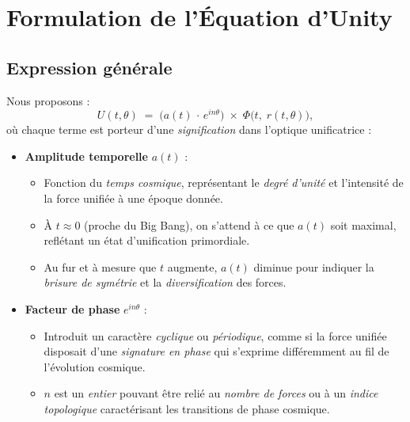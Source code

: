 \documentclass[12pt]{article}
\begin{document}
\section{Formulation de l'Équation d'Unity}

\subsection{Expression générale}

Nous proposons :
\begin{equation}
\label{eq:unity}
U(t,\theta) 
\;=\; \bigl(a(t)\,\cdot\,e^{i n \theta}\bigr)\;\times\;\Phi\bigl(t,\;r(t,\theta)\bigr),
\end{equation}
où chaque terme est porteur d'une \emph{signification} dans l'optique unificatrice :

\begin{itemize}
    \item \textbf{Amplitude temporelle} $a(t)$ : 
    \begin{itemize}
        \item Fonction du \emph{temps cosmique}, représentant le \textit{degré d'unité} 
              et l'intensité de la force unifiée à une époque donnée.
        \item À $t \approx 0$ (proche du Big Bang), on s'attend à ce que $a(t)$ soit maximal, 
              reflétant un état d'unification primordiale.
        \item Au fur et à mesure que $t$ augmente, $a(t)$ diminue pour indiquer la 
              \textit{brisure de symétrie} et la \textit{diversification} des forces.
    \end{itemize}

    \item \textbf{Facteur de phase} $e^{i n \theta}$ :
    \begin{itemize}
        \item Introduit un caractère \emph{cyclique} ou \emph{périodique}, 
              comme si la force unifiée disposait d'une \textit{signature en phase} 
              qui s’exprime différemment au fil de l'évolution cosmique.
        \item $n$ est un \emph{entier} pouvant être relié au \textit{nombre de forces} 
              ou à un \textit{indice topologique} caractérisant les transitions 
              de phase cosmique.
    \end{itemize}


\end{itemize}
\end{document}
